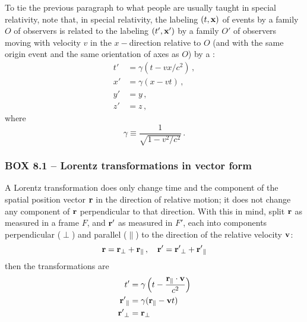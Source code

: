 To tie the previous paragraph to what people are usually taught in special relativity, note that, in special relativity, 
the labeling $(t, \vb{x})$ of events by a family $O$ of observers is related to the labeling $(t', \vb{x}')$ by a family $O'$ of observers moving with velocity $v$ in the $x-$direction relative to $O$ (and with the same origin event and the same orientation of axes as $O$) by a :
\begin{equation}\label{eq:8.3}
\begin{aligned}
t' &= \gamma (t - vx/c^2)\,,\\
x' &= \gamma (x - vt)\,,\\
y' &= y\,,\\
z' &= z\,,
\end{aligned}
\end{equation}
where   
\begin{equation}\label{eq:8.4}
\gamma \equiv \frac{1}{\sqrt{1 - v^2/c^2}}\,.
\end{equation}

\newpage

\subsubsection*{BOX 8.1 -- Lorentz transformations in vector form}\label{box:8.1}
\parindent=0pt  %
\parbox{\textwidth}{\begin{mdframed}[style=MyFrame] %
A Lorentz transformation does only change time and the component of the spatial position vector $\vb{r}$ in the direction of relative motion; it does not change any component of $\vb{r}$ perpendicular to that direction. With this in mind, split $\vb{r}$ as measured in a frame $F$, and $\vb{r}'$ as measured in $F'$, each into components perpendicular ($\perp$) and parallel ($\parallel$) to the direction of the relative velocity $\vb{v}$:
\begin{equation*}
\vb{r} = \vb{r}_\perp + \vb{r}_\parallel\,,\quad \vb{r'} = \vb{r'}_\perp + \vb{r'}_\parallel 
\end{equation*}
then the transformations are 
\begin{align*}
t' &= \gamma \left( t - \frac{\vb{r}_\parallel \cdot \vb{v}}{c^2} \right)\\
\vb{r'}_\parallel &= \gamma (\vb{r}_\parallel - \vb{v}t)\\
\vb{r'}_\perp &= \vb{r}_\perp
\end{align*}
\end{mdframed}} %
\parindent=10pt %

